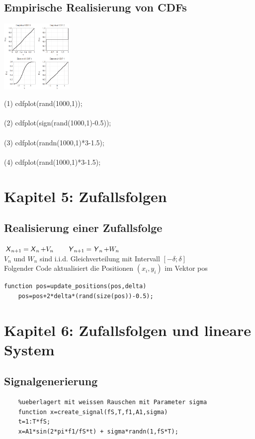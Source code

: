 \documentclass[deutsch]{latex4ei/latex4ei_sheet}
\begin{document}
\begin{sectionbox}
	\subsection{Empirische Realisierung von CDFs}	
	\parbox{3.5cm}{
		\includegraphics[width = 3.5cm]{img/cdf-sample.png}
	}
	\parbox{3.5cm}{
		(1)	cdfplot(rand(1000,1)); \\\\
		(2)	cdfplot(sign(rand(1000,1)-0.5)); \\\\
		(3)	cdfplot(randn(1000,1)*3-1.5); \\\\
		(4)	cdfplot(rand(1000,1)*3-1.5);
		}
\end{sectionbox}

\section{Kapitel 5: Zufallsfolgen}
\begin{sectionbox}
	\subsection{Realisierung einer Zufallsfolge}
	$\operatorname{\textsf{\textit{X}}}_{n+1}=\operatorname{\textsf{\textit{X}}}_n+V_n \qquad \operatorname{\textsf{\textit{Y}}}_{n+1}=\operatorname{\textsf{\textit{Y}}}_n+W_n$ \\
	$V_n$ und $W_n$ sind i.i.d. Gleichverteilung mit Intervall $[-\delta;\delta]$\\
	Folgender Code aktualisiert die Positionen $(x_i,y_i)$ im Vektor pos
	\begin{lstlisting}[gobble=4]
	function pos=update_positions(pos,delta)
	pos=pos+2*delta*(rand(size(pos))-0.5);
	\end{lstlisting}
\end{sectionbox}

\section{Kapitel 6: Zufallsfolgen und lineare System}
\begin{sectionbox}
	\subsection{Signalgenerierung}
	\begin{lstlisting}[gobble=4]
	%Erstellt Sinussignal der Frequenz f1 mit der Amplitude A1,
	%ueberlagert mit weissen Rauschen mit Parameter sigma
	function x=create_signal(fS,T,f1,A1,sigma)
	t=1:T*fS;
	x=A1*sin(2*pi*f1/fS*t) + sigma*randn(1,fS*T);
	\end{lstlisting}
\end{sectionbox}
\end{document}
